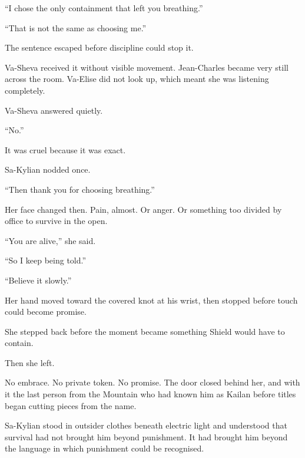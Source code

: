 “I chose the only containment that left you breathing.”\par

“That is not the same as choosing me.”\par

The sentence escaped before discipline could stop it.\par

Va-Sheva received it without visible movement. Jean-Charles became very still across the room. Va-Elise did not look up, which meant she was listening completely.\par

Va-Sheva answered quietly.\par

“No.”\par

It was cruel because it was exact.\par

Sa-Kylian nodded once.\par

“Then thank you for choosing breathing.”\par

Her face changed then. Pain, almost. Or anger. Or something too divided by office to survive in the open.\par

“You are alive,” she said.\par

“So I keep being told.”\par

“Believe it slowly.”\par
Her hand moved toward the covered knot at his wrist, then stopped before touch could become promise.\par
She stepped back before the moment became something Shield would have to contain.\par
Then she left.\par

No embrace. No private token. No promise. The door closed behind her, and with it the last person from the Mountain who had known him as Kailan before titles began cutting pieces from the name.\par

Sa-Kylian stood in outsider clothes beneath electric light and understood that survival had not brought him beyond punishment. It had brought him beyond the language in which punishment could be recognised.\par

